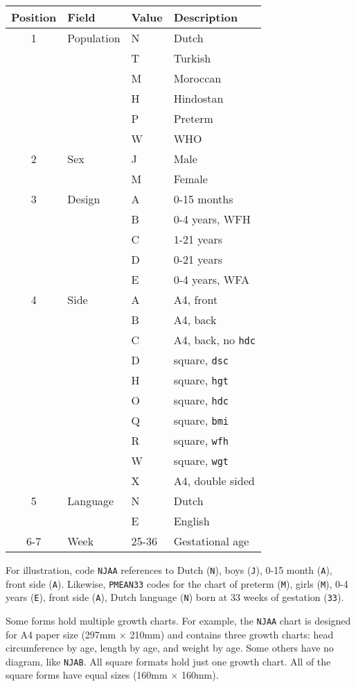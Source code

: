 \documentclass[
]{book}
\begin{document}
\begin{longtable}[]{@{}clll@{}}
\toprule
Position & Field & Value & Description \\
\midrule
\endhead
1 & Population & N & Dutch \\
& & T & Turkish \\
& & M & Moroccan \\
& & H & Hindostan \\
& & P & Preterm \\
& & W & WHO \\
2 & Sex & J & Male \\
& & M & Female \\
3 & Design & A & 0-15 months \\
& & B & 0-4 years, WFH \\
& & C & 1-21 years \\
& & D & 0-21 years \\
& & E & 0-4 years, WFA \\
4 & Side & A & A4, front \\
& & B & A4, back \\
& & C & A4, back, no \texttt{hdc} \\
& & D & square, \texttt{dsc} \\
& & H & square, \texttt{hgt} \\
& & O & square, \texttt{hdc} \\
& & Q & square, \texttt{bmi} \\
& & R & square, \texttt{wfh} \\
& & W & square, \texttt{wgt} \\
& & X & A4, double sided \\
5 & Language & N & Dutch \\
& & E & English \\
6-7 & Week & 25-36 & Gestational age \\
\bottomrule
\end{longtable}

For illustration, code \texttt{NJAA} references to Dutch (\texttt{N}), boys (\texttt{J}), 0-15 month (\texttt{A}), front side (\texttt{A}). Likewise, \texttt{PMEAN33} codes for the chart of preterm (\texttt{M}), girls (\texttt{M}), 0-4 years (\texttt{E}), front side (\texttt{A}), Dutch language (\texttt{N}) born at 33 weeks of gestation (\texttt{33}).

Some forms hold multiple growth charts. For example, the \texttt{NJAA} chart is designed for A4 paper size (297mm \(\times\) 210mm) and contains three growth charts: head circumference by age, length by age, and weight by age. Some others have no diagram, like \texttt{NJAB}. All square formats hold just one growth chart. All of the square forms have equal sizes (160mm \(\times\) 160mm).
\end{document}
